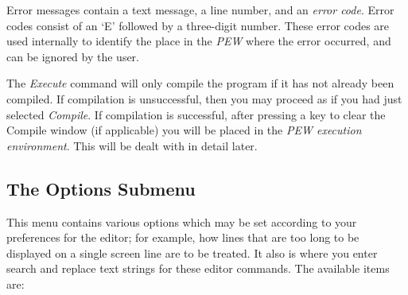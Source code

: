 Error messages contain a text message, a line number, and an {\em
error code}. Error codes consist of an `E' followed by a three-digit
number. These error codes are used internally to identify the place
in the {\em PEW} where the error occurred, and can be ignored by the
user.

The {\em Execute} command will only compile the program if it has not
already been compiled. If compilation is unsuccessful, then you may
proceed as if you had just selected {\em Compile}. If compilation is
successful, after pressing a key to clear the Compile window (if
applicable) you will be placed in the {\em PEW execution
environment}. This will be dealt with in detail later.

\subsection[The Options Submenu]{The Options Submenu}
\label{optionmenu}

This menu contains various options which may be set according to 
your preferences for the editor; for example, how lines that are too
long to be displayed on a single screen line are to be treated. It
also is where you enter search and replace text strings for these
editor commands. The available items are:

